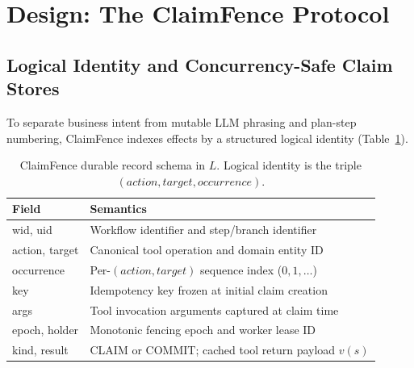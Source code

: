 \documentclass[10pt,journal]{IEEEtran}
\def\CF{ClaimFence}%
\def\texttt#1{#1}%
\theoremstyle{definition}
\theoremstyle{remark}
\newcommand{\CF}{\textsc{ClaimFence}}
\begin{document}
\section{Design: The \CF{} Protocol}\label{sec:design}

\subsection{Logical Identity and Concurrency-Safe Claim Stores}
To separate business intent from mutable LLM phrasing and plan-step numbering, \CF{} indexes effects by a structured logical identity (Table~\ref{tab:schema}).

\begin{table}[!t]
\centering
\caption{\CF{} durable record schema in $L$. Logical identity is the triple $(\mathit{action}, \mathit{target}, \mathit{occurrence})$.}
\label{tab:schema}
\renewcommand{\arraystretch}{1.10}
\begin{tabular}{@{}p{}p{}@{}}
\toprule
\textbf{Field} & \textbf{Semantics} \\
\midrule
\texttt{wid}, \texttt{uid} & Workflow identifier and step/branch identifier \\
\texttt{action}, \texttt{target} & Canonical tool operation and domain entity ID \\
\texttt{occurrence} & Per-$(\mathit{action},\mathit{target})$ sequence index ($0, 1, \dots$) \\
\texttt{key} & Idempotency key frozen at initial claim creation \\
\texttt{args} & Tool invocation arguments captured at claim time \\
\texttt{epoch}, \texttt{holder} & Monotonic fencing epoch and worker lease ID \\
\texttt{kind}, \texttt{result} & \texttt{CLAIM} or \texttt{COMMIT}; cached tool return payload $v(s)$ \\
\bottomrule
\end{tabular}
\end{table}
\end{document}

